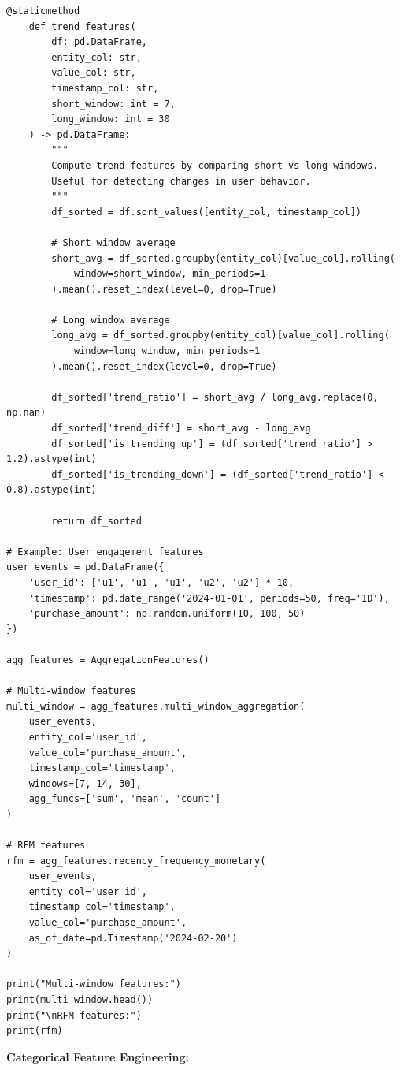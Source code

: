 \begin{lstlisting}[style=python, caption=Advanced aggregation patterns for ML features]
    @staticmethod
    def trend_features(
        df: pd.DataFrame,
        entity_col: str,
        value_col: str,
        timestamp_col: str,
        short_window: int = 7,
        long_window: int = 30
    ) -> pd.DataFrame:
        """
        Compute trend features by comparing short vs long windows.
        Useful for detecting changes in user behavior.
        """
        df_sorted = df.sort_values([entity_col, timestamp_col])

        # Short window average
        short_avg = df_sorted.groupby(entity_col)[value_col].rolling(
            window=short_window, min_periods=1
        ).mean().reset_index(level=0, drop=True)

        # Long window average
        long_avg = df_sorted.groupby(entity_col)[value_col].rolling(
            window=long_window, min_periods=1
        ).mean().reset_index(level=0, drop=True)

        df_sorted['trend_ratio'] = short_avg / long_avg.replace(0, np.nan)
        df_sorted['trend_diff'] = short_avg - long_avg
        df_sorted['is_trending_up'] = (df_sorted['trend_ratio'] > 1.2).astype(int)
        df_sorted['is_trending_down'] = (df_sorted['trend_ratio'] < 0.8).astype(int)

        return df_sorted

# Example: User engagement features
user_events = pd.DataFrame({
    'user_id': ['u1', 'u1', 'u1', 'u2', 'u2'] * 10,
    'timestamp': pd.date_range('2024-01-01', periods=50, freq='1D'),
    'purchase_amount': np.random.uniform(10, 100, 50)
})

agg_features = AggregationFeatures()

# Multi-window features
multi_window = agg_features.multi_window_aggregation(
    user_events,
    entity_col='user_id',
    value_col='purchase_amount',
    timestamp_col='timestamp',
    windows=[7, 14, 30],
    agg_funcs=['sum', 'mean', 'count']
)

# RFM features
rfm = agg_features.recency_frequency_monetary(
    user_events,
    entity_col='user_id',
    timestamp_col='timestamp',
    value_col='purchase_amount',
    as_of_date=pd.Timestamp('2024-02-20')
)

print("Multi-window features:")
print(multi_window.head())
print("\nRFM features:")
print(rfm)
\end{lstlisting}

\textbf{Categorical Feature Engineering:}

